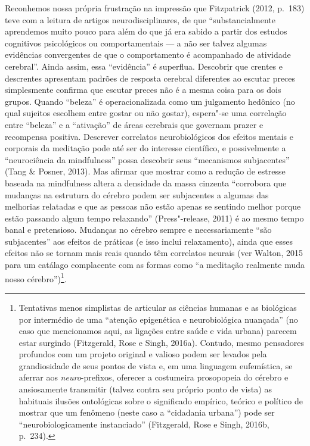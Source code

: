 Reconhemos nossa própria frustração na impressão que Fitzpatrick (2012,
p.~183) teve com a leitura de artigos neurodisciplinares, de que
``substancialmente aprendemos muito pouco para além do que já era sabido
a partir dos estudos cognitivos psicológicos ou comportamentais --- a
não ser talvez algumas evidências convergentes de que o comportamento é
acompanhado de atividade cerebral''. Ainda assim, essa ``evidência'' é
superflua. Descobrir que crentes e descrentes apresentam padrões de
resposta cerebral diferentes ao escutar preces simplesmente confirma que
escutar preces não é a mesma coisa para os dois grupos. Quando
``beleza'' é operacionalizada como um julgamento hedônico (no qual
sujeitos escolhem entre gostar ou não gostar), espera"-se uma correlação
entre ``beleza'' e a ``ativação'' de áreas cerebrais que governam prazer
e recompensa positiva. Descrever correlatos neurobiológicos dos efeitos
mentais e corporais da meditação pode até ser do interesse científico, e
possivelmente a ``neurociência da mindfulness'' possa descobrir seus
``mecanismos subjacentes'' (Tang \& Posner, 2013). Mas afirmar que
mostrar como a redução de estresse baseada na mindfulness altera a
densidade da massa cinzenta ``corrobora que mudanças na estrutura do
cérebro podem ser subjacentes a algumas das melhorias relatadas e que as
pessoas não estão apenas se sentindo melhor porque estão passando algum
tempo relaxando'' (Press"-release, 2011) é ao mesmo tempo banal e
pretensioso. Mudanças no cérebro sempre e necessariamente ``são
subjacentes'' aos efeitos de práticas (e isso inclui relaxamento), ainda
que esses efeitos não se tornam mais reais quando têm correlatos neurais
(ver Walton, 2015 para um catálago complacente com as formas como ``a
meditação realmente muda nosso cérebro'')\footnote[7]{Tentativas menos simplistas de articular as ciências humanas e as
biológicas por intermédio de uma ``atenção epigenética e neurobiológica
nuançada'' (no caso que mencionamos aqui, as ligações entre saúde e vida
urbana) parecem estar surgindo (Fitzgerald, Rose e Singh, 2016a).
Contudo, mesmo pensadores profundos com um projeto original e valioso
podem ser levados pela grandiosidade de seus pontos de vista e, em uma
linguagem eufemística, se aferrar aos \emph{neuro}-prefixos, oferecer a
costumeira prosopopeia do cérebro e ansiosamente transmitir (talvez
contra seu próprio ponto de vista) as habituais ilusões ontológicas
sobre o significado empírico, teórico e político de mostrar que um
fenômeno (neste caso a ``cidadania urbana'') pode ser
``neurobiologicamente instanciado'' (Fitzgerald, Rose e Singh, 2016b,
p.~234).}.

